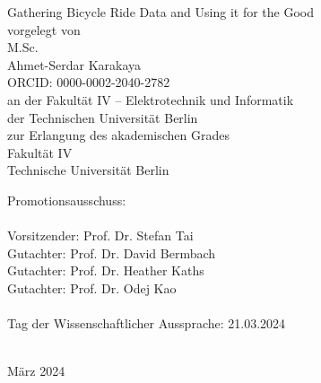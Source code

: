 
\thispagestyle{empty}
\begin{center}
    \huge{Gathering Bicycle Ride Data and Using it for the Good}\\[2pc]
    
    \large{vorgelegt von}\\
    \large{M.Sc.}\\
    \large{Ahmet-Serdar Karakaya}\\
    \large{ORCID: 0000-0002-2040-2782}\\[2pc]


    an der Fakultät IV – Elektrotechnik und Informatik\\
    der Technischen Universität Berlin\\
    zur Erlangung des akademischen Grades\\
    Fakultät IV\\
    Technische Universität Berlin
\end{center}
Promotionsausschuss:\\
\\
Vorsitzender: Prof. Dr. Stefan Tai\\
Gutachter: Prof. Dr. David Bermbach\\
Gutachter: Prof. Dr. Heather Kaths\\
Gutachter: Prof. Dr. Odej Kao\\
\\
Tag der Wissenschaftlicher Aussprache: 21.03.2024\\
\\
\begin{center}
März 2024
\end{center}

\afterpage{\null\thispagestyle{empty}\newpage}
